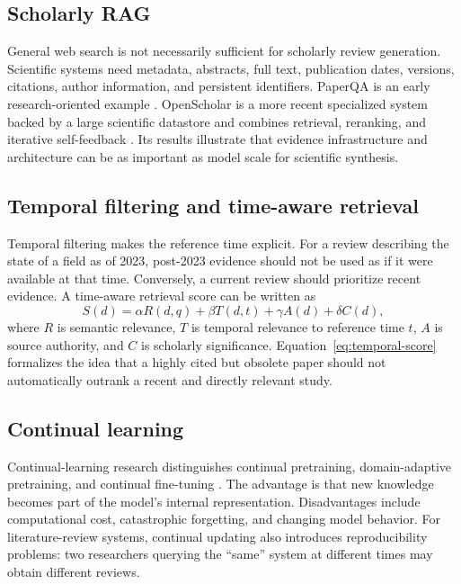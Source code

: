 \documentclass[manuscript,screen]{acmart}
\begin{document}
\subsection{Scholarly RAG}\label{subsec:scholarly-rag}
General web search is not necessarily sufficient for scholarly review generation. Scientific systems need
metadata, abstracts, full text, publication dates, versions, citations, author information, and persistent
identifiers. PaperQA is an early research-oriented example \cite{lala2023}. OpenScholar is a more recent
specialized system backed by a large scientific datastore and combines retrieval, reranking, and iterative
self-feedback \cite{asai2026}. Its results illustrate that evidence infrastructure and architecture can be as
important as model scale for scientific synthesis.

\subsection{Temporal filtering and time-aware retrieval}\label{subsec:filtering}
Temporal filtering makes the reference time explicit. For a review describing the state of a field as of 2023,
post-2023 evidence should not be used as if it were available at that time. Conversely, a current review should
prioritize recent evidence. A time-aware retrieval score can be written as
\begin{equation}
    S(d)=\alpha R(d,q)+\beta T(d,t)+\gamma A(d)+\delta C(d),
    \label{eq:temporal-score}
\end{equation}
where $R$ is semantic relevance, $T$ is temporal relevance to reference time $t$, $A$ is source authority,
and $C$ is scholarly significance. Equation~\eqref{eq:temporal-score} formalizes the idea that a highly cited
but obsolete paper should not automatically outrank a recent and directly relevant study.

\subsection{Continual learning}\label{subsec:continual}
Continual-learning research distinguishes continual pretraining, domain-adaptive pretraining, and continual
fine-tuning \cite{wu2024,shi2024}. The advantage is that new knowledge becomes part of the model's internal
representation. Disadvantages include computational cost, catastrophic forgetting, and changing model behavior.
For literature-review systems, continual updating also introduces reproducibility problems: two researchers
querying the ``same'' system at different times may obtain different reviews.
\end{document}
